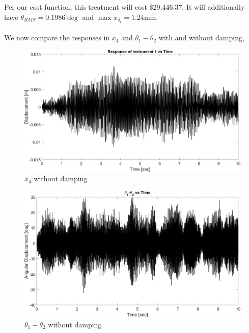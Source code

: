 \documentclass{article}
\begin{document}
\noindent Per our cost function, this treatment will cost \$29,446.37. It will additionally have $\theta_{RMS}=0.1986\deg$ and $\max{x_{4_{i}}}=1.24$mm.
\\
\\
\noindent We now compare the responses in $x_{4}$ and $\theta_1-\theta_{2}$ with and without damping,
\begin{figure}[H]
    \vspace{-10pt}
    \includegraphics[width=1\textwidth,left]{MCHE 6390/Project 2/Figures/Figure_3.png}
    \captionsetup{justification=raggedright,singlelinecheck=false}
    \caption{$x_{4}$ without damping}
    \label{fig:x4nodamp}
\end{figure}
\begin{figure}[H]
    \vspace{-10pt}
    \includegraphics[width=1\textwidth,left]{MCHE 6390/Project 2/Figures/Figure_4.png}
    \captionsetup{justification=raggedright,singlelinecheck=false}
    \caption{$\theta_{1}-\theta_{2}$ without damping}
    \label{fig:t1t2nodamp}
\end{figure}
\end{document}
